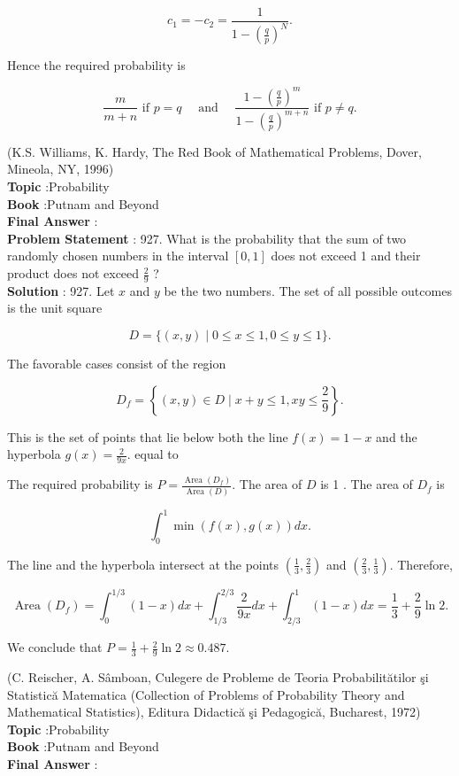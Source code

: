 \documentclass[10pt]{article}
\begin{document}
$$
c_{1}=-c_{2}=\frac{1}{1-\left(\frac{q}{p}\right)^{N}} .
$$

Hence the required probability is

$$
\frac{m}{m+n} \text { if } p=q \quad \text { and } \quad \frac{1-\left(\frac{q}{p}\right)^{m}}{1-\left(\frac{q}{p}\right)^{m+n}} \text { if } p \neq q .
$$

(K.S. Williams, K. Hardy, The Red Book of Mathematical Problems, Dover, Mineola, NY, 1996)
\\
\textbf{Topic} :Probability\\
\textbf{Book} :Putnam and Beyond\\
\textbf{Final Answer} :\\


\textbf{Problem Statement} :
927. What is the probability that the sum of two randomly chosen numbers in the interval $[0,1]$ does not exceed 1 and their product does not exceed $\frac{2}{9}$ ?
\\
\textbf{Solution} :
927. Let $x$ and $y$ be the two numbers. The set of all possible outcomes is the unit square

$$
D=\{(x, y) \mid 0 \leq x \leq 1,0 \leq y \leq 1\} .
$$

The favorable cases consist of the region

$$
D_{f}=\left\{(x, y) \in D \mid x+y \leq 1, x y \leq \frac{2}{9}\right\} .
$$

This is the set of points that lie below both the line $f(x)=1-x$ and the hyperbola $g(x)=\frac{2}{9 x}$. equal to

The required probability is $P=\frac{\operatorname{Area}\left(D_{f}\right)}{\operatorname{Area}(D)}$. The area of $D$ is 1 . The area of $D_{f}$ is

$$
\int_{0}^{1} \min (f(x), g(x)) d x .
$$

The line and the hyperbola intersect at the points $\left(\frac{1}{3}, \frac{2}{3}\right)$ and $\left(\frac{2}{3}, \frac{1}{3}\right)$. Therefore,

$$
\operatorname{Area}\left(D_{f}\right)=\int_{0}^{1 / 3}(1-x) d x+\int_{1 / 3}^{2 / 3} \frac{2}{9 x} d x+\int_{2 / 3}^{1}(1-x) d x=\frac{1}{3}+\frac{2}{9} \ln 2 .
$$

We conclude that $P=\frac{1}{3}+\frac{2}{9} \ln 2 \approx 0.487$.

(C. Reischer, A. Sâmboan, Culegere de Probleme de Teoria Probabilitătilor şi Statistică Matematica (Collection of Problems of Probability Theory and Mathematical Statistics), Editura Didactică şi Pedagogică, Bucharest, 1972)
\\
\textbf{Topic} :Probability\\
\textbf{Book} :Putnam and Beyond\\
\textbf{Final Answer} :\\
\end{document}
